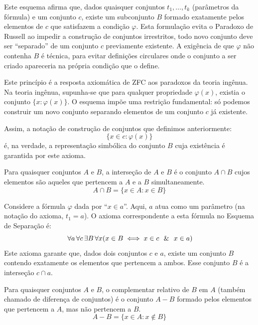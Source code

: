 Este esquema afirma que, dados quaisquer conjuntos \(t_1, \dots, t_k\) (parâmetros da fórmula) e um conjunto \(c\), existe um subconjunto \(B\) formado exatamente pelos elementos de \(c\) que satisfazem a condição \(\varphi\). Esta formulação evita o Paradoxo de Russell ao impedir a construção de conjuntos irrestritos, todo novo conjunto deve ser ``separado'' de um conjunto \(c\) previamente existente. A exigência de que \(\varphi\) não contenha \(B\) é técnica, para evitar definições circulares onde o conjunto a ser criado apareceria na própria condição que o define.

Este princípio é a resposta axiomática de ZFC aos paradoxos da teoria ingênua. Na teoria ingênua, supunha-se que para qualquer propriedade \(\varphi(x)\), existia o conjunto \(\{x : \varphi(x)\}\). O esquema impõe uma restrição fundamental: só podemos construir um novo conjunto separando elementos de um conjunto \(c\) já existente.

Assim, a notação de construção de conjuntos que definimos anteriormente:
\[
    \{x \in c : \varphi(x)\}
\]
é, na verdade, a representação simbólica do conjunto \(B\) cuja existência é garantida por este axioma.

\begin{definicao}
    \label{def:intersecao_finita}
    Para quaisquer conjuntos \(A\) e \(B\), a interseção de \(A\) e \(B\) é o conjunto \(A \cap B\) cujos elementos são aqueles que pertencem a \(A\) e a \(B\) simultaneamente.
    \[
        A \cap B = \{x\in A: x \in B\}
    \]
\end{definicao}



\begin{exemplo}
    Considere a fórmula \(\varphi\) dada por ``\(x \in a\)''. Aqui, \(a\) atua como um parâmetro (na notação do axioma, \(t_1 = a\)). O axioma correspondente a esta fórmula no Esquema de Separação é:
    \[
        \forall a \forall c \exists B \forall x (x \in B \iff x \in c \e x \in a)
    \]
    Este axioma garante que, dados dois conjuntos \(c\) e \(a\), existe um conjunto \(B\) contendo exatamente os elementos que pertencem a ambos. Esse conjunto \(B\) é a interseção \(c \cap a\).
\end{exemplo}

\begin{definicao}
    \label{def:complemento_relativo}
    Para quaisquer conjuntos \(A\) e \(B\), o complementar relativo de \(B\) em \(A\) (também chamado de diferença de conjuntos) é o conjunto \(A - B\) formado pelos elementos que pertencem a \(A\), mas não pertencem a \(B\).
    \[
        A - B = \{x \in A : x \notin B\}
    \]
\end{definicao}

